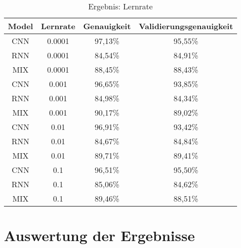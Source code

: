     \begin{table}[H]
        \centering
        \begin{tabular}{|c|c|c|c|}
            \hline
            Model & Lernrate & Genauigkeit & Validierungsgenauigkeit \\
            \hline
            CNN & 0.0001 & 97,13\% & 95,55\% \\
            \hline
            RNN & 0.0001 & 84,54\% & 84,91\% \\
            \hline
            MIX & 0.0001 & 88,45\% & 88,43\% \\
            \hline
            \hline
            CNN & 0.001  & 96,65\% & 93,85\% \\
            \hline
            RNN & 0.001  & 84,98\% & 84,34\% \\
            \hline
            MIX & 0.001  & 90,17\% & 89,02\% \\
            \hline
            \hline
            CNN & 0.01   & 96,91\% & 93,42\% \\
            \hline
            RNN & 0.01   & 84,67\% & 84,84\% \\
            \hline
            MIX & 0.01   & 89,71\% & 89,41\% \\
            \hline
            \hline
            CNN & 0.1    & 96,51\% & 95,50\% \\
            \hline
            RNN & 0.1    & 85,06\% & 84,62\% \\
            \hline
            MIX & 0.1    & 89,46\% & 88,51\% \\
            \hline
        \end{tabular}
        \caption{Ergebnis: Lernrate}
        \label{tabl:ErgebnisLernrate}
    \end{table}   


\section{Auswertung der Ergebnisse}

